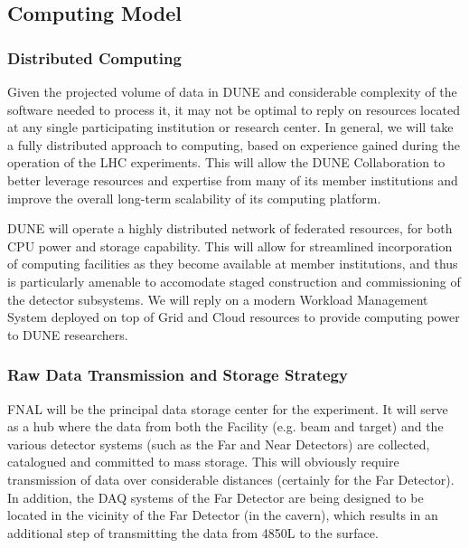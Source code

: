 \subsection{Computing Model}
\label{sec:detectors-sc-infrastructure-computing-model}

\subsubsection{Distributed Computing}

Given the projected volume of  data in DUNE and considerable complexity of the software needed to process it, it may not be optimal to reply on resources located at any single
participating institution or research center. In general, we will take a fully distributed approach to computing, based on experience gained during the operation of the LHC experiments.
This will allow the DUNE Collaboration to better leverage resources and expertise from many of its member institutions and improve the overall long-term scalability of its computing
platform.

DUNE will operate a highly distributed network of federated resources, for both CPU power and storage capability. This will allow for streamlined incorporation of computing facilities
as they become available at member institutions, and thus is particularly amenable to accomodate staged construction and commissioning of the detector subsystems. We will reply
on a modern Workload Management System deployed on top of Grid and Cloud resources to provide computing power to DUNE researchers.

\subsubsection{Raw Data Transmission and Storage Strategy}
FNAL will be the principal data storage center for the experiment. It will serve as a hub where the data from both the Facility (e.g. beam and target)
and the various detector systems (such as the  Far and Near Detectors)  are collected, catalogued and committed to mass storage. This will obviously require transmission of
data over considerable distances (certainly for the Far Detector). In addition, the DAQ systems of the Far Detector are being designed to be located  in the vicinity of
the Far Detector (in the cavern), which results in an additional step of transmitting the data from 4850L to the surface.

